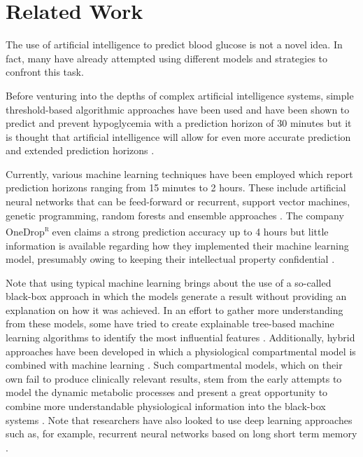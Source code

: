 
\section{Related Work}

The use of artificial intelligence to predict blood glucose is not a novel idea. In fact, many have already attempted using different models and strategies to confront this task.

Before venturing into the depths of complex artificial intelligence systems, simple threshold-based algorithmic approaches have been used and have been shown to predict and prevent hypoglycemia with a prediction horizon of 30 minutes but it is thought that artificial intelligence will allow for even more accurate prediction and extended prediction horizons \cite{buckingham_evaluation_2017,duckworth_explainable_2024}.

Currently, various machine learning techniques have been employed which report prediction horizons ranging from 15 minutes to 2 hours. These include artificial neural networks that can be feed-forward or recurrent, support vector machines, genetic programming, random forests and ensemble approaches \cite{woldaregay_data-driven_2019}. The company OneDrop\textsuperscript{\textcircled{\textsc{r}}} even claims a strong prediction accuracy up to 4 hours but little information is available regarding how they implemented their machine learning model, presumably owing to keeping their intellectual property confidential \cite{noauthor_one_nodate}.

Note that using typical machine learning brings about the use of a so-called black-box approach in which the models generate a result without providing an explanation on how it was achieved. In an effort to gather more understanding from these models, some have tried to create explainable tree-based machine learning algorithms to identify the most influential features \cite{duckworth_explainable_2024}. Additionally, hybrid approaches have been developed in which a physiological compartmental model is combined with machine learning \cite{woldaregay_data-driven_2019}. Such compartmental models, which on their own fail to produce clinically relevant results, stem from the early attempts to model the dynamic metabolic processes and present a great opportunity to combine more understandable physiological information into the black-box systems \cite{lehmann_compartmental_1998,mougiakakou_real_2005}. Note that researchers have also looked to use deep learning approaches such as, for example, recurrent neural networks based on long short term memory \cite{deng_deep_2021}.


